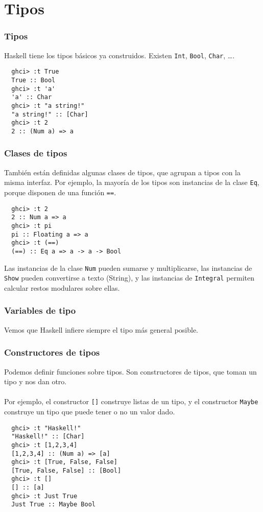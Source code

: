 \section{Tipos}

\begin{frame}[fragile]
  \frametitle{Tipos}
  Haskell tiene los tipos básicos ya construidos. Existen
  \texttt{Int}, \texttt{Bool}, \texttt{Char}, \dots.
  \begin{lstlisting}
  ghci> :t True
  True :: Bool
  ghci> :t 'a'
  'a' :: Char
  ghci> :t "a string!"
  "a string!" :: [Char]
  ghci> :t 2
  2 :: (Num a) => a
  \end{lstlisting}
\end{frame}


\begin{frame}[fragile]
  \frametitle{Clases de tipos}
  También están definidas algunas clases de tipos, que agrupan a tipos con la misma interfaz.
  Por ejemplo, la mayoría de los tipos son instancias de la clase \texttt{Eq}, porque disponen de una
  función \texttt{==}.
  
  \begin{lstlisting}
  ghci> :t 2
  2 :: Num a => a
  ghci> :t pi
  pi :: Floating a => a
  ghci> :t (==)
  (==) :: Eq a => a -> a -> Bool
  \end{lstlisting}
  
  Las instancias
  de la clase \texttt{Num} pueden sumarse y multiplicarse, las instancias de \texttt{Show}
  pueden convertirse a texto (String), y las instancias de \texttt{Integral} permiten 
  calcular restos modulares sobre ellas.
\end{frame}


\begin{frame}[fragile]
  \frametitle{Variables de tipo}
  Vemos que Haskell infiere siempre el tipo más general posible.
\end{frame}


\begin{frame}[fragile]
  \frametitle{Constructores de tipos}
  Podemos definir funciones
  sobre tipos. Son constructores de tipos, que toman un tipo y nos dan otro.
  \\~\\
  Por ejemplo, el constructor \texttt{[]} construye listas de un tipo, y el 
  constructor \texttt{Maybe} construye un tipo que puede tener o no un valor dado.
  
  \begin{lstlisting}
  ghci> :t "Haskell!"
  "Haskell!" :: [Char]
  ghci> :t [1,2,3,4]
  [1,2,3,4] :: (Num a) => [a]
  ghci> :t [True, False, False]
  [True, False, False] :: [Bool]
  ghci> :t []
  [] :: [a]
  ghci> :t Just True
  Just True :: Maybe Bool
  \end{lstlisting}
  
\end{frame}